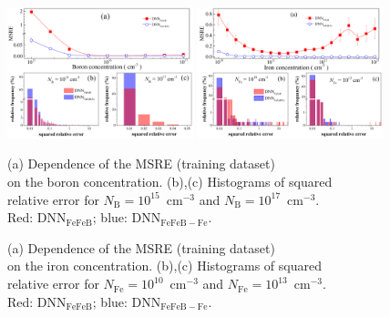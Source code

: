 \documentclass[a4paper,fleqn]{cas-sc}
\begin{document}
\begin{figure}[tb]
\centering
\includegraphics[width=0.48\textwidth]{F6} \hfill
\includegraphics[width=0.48\textwidth]{F7} \\
\parbox[t]{0.48\textwidth}
{\caption{(a) Dependence of the MSRE (training dataset) \\on the boron concentration.
(b),(c) Histograms of squared \\ relative error for $N_\mathrm{B}=10^{15}$~cm$^{-3}$ and $N_\mathrm{B}=10^{17}$~cm$^{-3}$.\\
Red: DNN$_\mathrm{FeFeB}$; blue: DNN$_\mathrm{FeFeB-Fe}$.
}
\label{fig_B}} \hfill
\parbox[t]{0.48\textwidth}{\caption{(a) Dependence of the MSRE (training dataset) \\on the iron concentration.
(b),(c) Histograms of squared \\ relative error for $N_\mathrm{Fe}=10^{10}$~cm$^{-3}$ and $N_\mathrm{Fe}=10^{13}$~cm$^{-3}$.\\
Red: DNN$_\mathrm{FeFeB}$; blue: DNN$_\mathrm{FeFeB-Fe}$.}
\label{fig_Fe}}
\end{figure}

%
\end{document}
